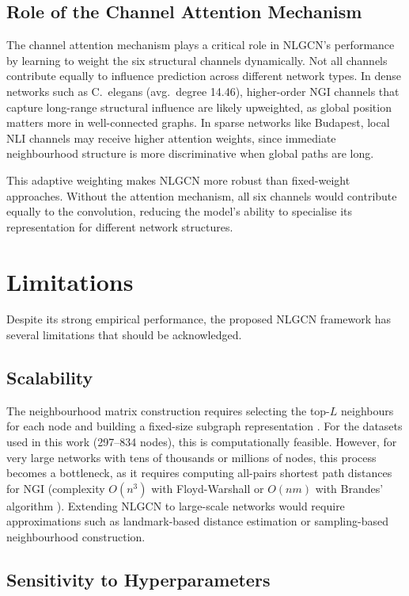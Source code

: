 \subsection{Role of the Channel Attention Mechanism}

The channel attention mechanism plays a critical
role in NLGCN's performance by learning to weight the six structural
channels dynamically. Not all channels contribute equally to influence
prediction across different network types. In dense networks such as
C.~elegans (avg.\ degree 14.46), higher-order NGI channels that
capture long-range structural influence are likely upweighted, as
global position matters more in well-connected graphs. In sparse
networks like Budapest, local NLI channels may receive higher
attention weights, since immediate neighbourhood structure is more
discriminative when global paths are long.

This adaptive weighting makes NLGCN more robust than fixed-weight
approaches. Without the attention
mechanism, all six channels would contribute equally to the
convolution, reducing the model's ability to specialise its
representation for different network structures.

\section{Limitations}

Despite its strong empirical performance, the proposed NLGCN
framework has several limitations that should be acknowledged.

\subsection{Scalability}

The neighbourhood matrix construction requires selecting the top-$L$
neighbours for each node and building a fixed-size subgraph
representation \cite{guo2026, tu2025}. For the datasets used in this
work (297--834 nodes), this is computationally feasible. However,
for very large networks with tens of thousands or millions of nodes,
this process becomes a bottleneck, as it requires computing all-pairs
shortest path distances for NGI (complexity $O(n^3)$ with
Floyd-Warshall or $O(nm)$ with Brandes' algorithm
\cite{farooq2018, chen2012}). Extending NLGCN to large-scale networks
would require approximations such as landmark-based distance
estimation or sampling-based neighbourhood construction.

\subsection{Sensitivity to Hyperparameters}

